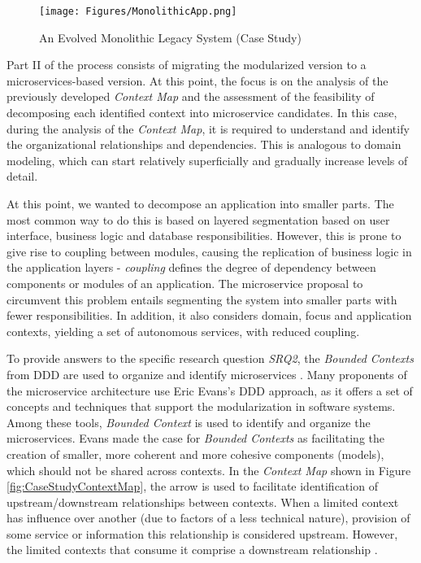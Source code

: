 \documentclass[a4paper,twoside]{article}
\begin{document}
\begin{figure}
\centering
\texttt{[image: Figures/MonolithicApp.png]}
\caption{An Evolved Monolithic Legacy System (Case Study) \cite{henriqueITNG2019expReport}}
\label{fig:EvolvedApp}
\end{figure}

Part II of the process consists of migrating the modularized version to a microservices-based version. At this point, the focus is on the analysis of the previously developed \textit{Context Map} and the assessment of the feasibility of decomposing each identified context into microservice candidates. In this case, during the analysis of the \textit{Context Map}, it is required to understand and identify the organizational relationships and dependencies. This is analogous to domain modeling, which can start relatively superficially and gradually increase levels of detail.

At this point, we wanted to decompose an application into smaller parts. The most common way to do this is based on layered segmentation based on user interface, business logic and database responsibilities. However, this is prone to give rise to coupling between modules, causing the replication of business logic in the application layers \cite{dragoni2017microservices} - \textit{coupling} defines the degree of dependency between components or modules of an application. The microservice proposal to circumvent this problem entails segmenting the system into smaller parts with fewer responsibilities. In addition, it also considers domain, focus and application contexts, yielding a set of autonomous services, with reduced coupling.

To provide answers to the specific research question \textit{SRQ2}, the \textit{Bounded Contexts} from DDD are used to organize and identify microservices \cite{nadareishvili2016microservice}. Many proponents of the microservice architecture use Eric Evans's DDD approach, as it offers a set of concepts and techniques that support the modularization in software systems. Among these tools, \textit{Bounded Context} is used to identify and organize the microservices. Evans made the case for \textit{Bounded Contexts} as facilitating the creation of smaller, more coherent and more cohesive components (models), which should not be shared across contexts.
In the \textit{Context Map} shown in Figure \ref{fig:CaseStudyContextMap}, the arrow is used to facilitate identification of upstream/downstream relationships between contexts. When a limited context has influence over another (due to factors of a less technical nature), provision of some service or information this relationship is considered upstream. However, the limited contexts that consume it comprise a  downstream relationship \cite{evans2004domain}.
\end{document}
